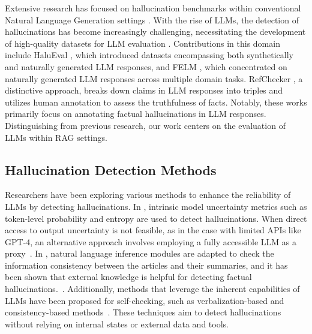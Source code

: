\documentclass[11pt]{article}
\begin{document}
Extensive research has focused on hallucination benchmarks within conventional Natural Language Generation settings \cite{dziri2022evaluating, zhong-etal-2021-qmsum, durmus-etal-2020-feqa, lin-etal-2022-truthfulqa}. With the rise of LLMs, the detection of hallucinations has become increasingly challenging, necessitating the development of high-quality datasets for LLM evaluation \cite{chen2023can}. Contributions in this domain include HaluEval \cite{Li2023}, which introduced datasets encompassing both synthetically and naturally generated LLM responses, and FELM \cite{chen2023felm}, which concentrated on naturally generated LLM responses across multiple domain tasks. RefChecker \cite{hu-etal-2023-bschecker}, a distinctive approach, breaks down claims in LLM responses into triples and utilizes human annotation to assess the truthfulness of facts. 
Notably, these works primarily focus on annotating factual hallucinations in LLM responses. Distinguishing from previous research, our work centers on the evaluation of LLMs within RAG settings. 




\subsection{Hallucination Detection Methods}
Researchers have been exploring various methods to enhance the reliability of LLMs by detecting hallucinations. 
In \citet{Azaria2023,xiao2021hallucination,malinin2021uncertainty}, intrinsic model uncertainty metrics such as token-level probability and entropy are used to detect hallucinations. 
When direct access to output uncertainty is not feasible, as in the case with limited APIs like GPT-4, an alternative approach involves employing a fully accessible LLM as a proxy~\cite{Manakul2023-selfcheckgpt}.
In \citet{falke2019ranking, barrantes2020nli}, natural language inference modules are adapted to check the information consistency between the articles and their summaries, and it has been shown that external knowledge is helpful for detecting factual hallucinations.~\cite{guo2022survey, Mallen2022}. 
Additionally, methods that leverage the inherent capabilities of LLMs have been proposed for self-checking, such as verbalization-based and consistency-based methods~\cite{xiong2023llms, Manakul2023-selfcheckgpt}. 
These techniques aim to detect hallucinations without relying on internal states or external data and tools.
\end{document}
